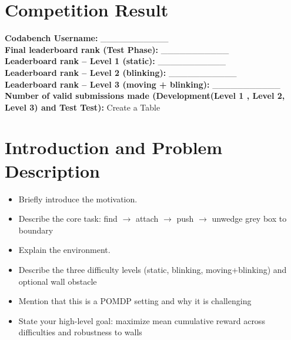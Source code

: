 \documentclass[11pt, oneside]{article}   	%
\begin{document}
\section{Competition Result}
\textbf{Codabench Username:} \_\_\_\_\_\_\_\_\_\_\_ \\
\textbf{Final leaderboard rank (Test Phase):} \_\_\_\_\_\_\_\_\_\_\_ \\
\textbf{Leaderboard rank – Level 1 (static):} \_\_\_\_\_\_\_\_\_\_\_ \\
\textbf{Leaderboard rank – Level 2 (blinking):} \_\_\_\_\_\_\_\_\_\_\_ \\
\textbf{Leaderboard rank – Level 3 (moving + blinking):} \_\_\_\_\_\_\_\_\_\_\_ \\

\textbf{Number of valid submissions made (Development(Level 1 , Level 2, Level 3) and Test Test):} Create a Table

\section{Introduction and Problem Description}
\begin{itemize}
    \item Briefly introduce the motivation.
    \item Describe the core task: find $\to$ attach $\to$ push $\to$ unwedge grey box to boundary
    \item Explain the environment.
    \item Describe the three difficulty levels (static, blinking, moving+blinking) and optional wall obstacle
    \item Mention that this is a POMDP setting and why it is challenging
    \item State your high-level goal: maximize mean cumulative reward across difficulties and robustness to walls
\end{itemize}
\end{document}
